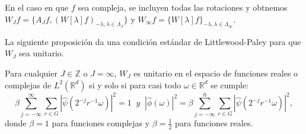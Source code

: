 \noindent En el caso en que $f$ sea compleja, se incluyen todas las rotaciones y obtnemos $W_Jf=\lbrace A_J f,(W[\lambda]f)_{-\lambda,\lambda \in \Lambda_J} \rbrace$ y $W_\infty f=\lbrace W[\lambda]f\rbrace_{-\lambda,\lambda \in \Lambda_\infty}$. 

\medskip

\noindent La siguiente proposición da una condición estándar de Littlewood-Paley para que $W_J$ sea unitario.

\begin{proposicion} \label{unitario}
 Para cualquier $J \in \mathbb{Z}$ o $J=\infty$, $W_J$ es unitario en el espacio de funciones reales o complejas de $L^2(\mathbb{R}^d)$ si y solo si para casi todo $\omega \in \mathbb{R}^d$ se cumple: 
    \begin{equation}\label{eq::1.2}
        \beta \sum_{j=-\infty}^\infty \sum_{r \in G} |\widehat{\psi}(2^{-j}r^{-1}\omega)|^2=1 \; \; y
        \;\;|\widehat{\phi}(\omega)|^2= \beta \sum_{j=-\infty}^0 \sum_{r\in G} |\widehat{\psi}(2^{-j}r^{-1}\omega)|^2,
    \end{equation}
 donde $\beta=1$ para funciones complejas y $\beta=\frac{1}{2}$ para funciones reales.
\end{proposicion}

